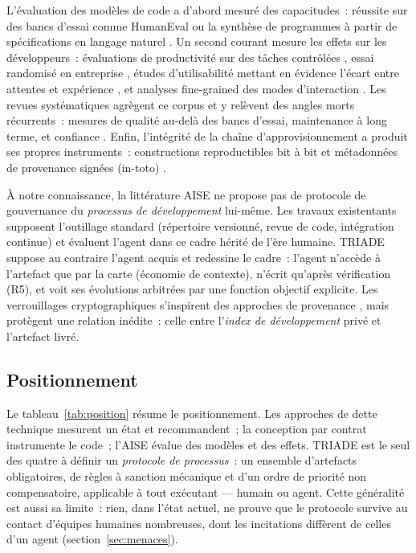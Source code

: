 L’évaluation des modèles de code a d’abord mesuré des capacitudes~: réussite
sur des bancs d’essai comme HumanEval \cite{chen2021} ou la synthèse de
programmes à partir de spécifications en langage naturel \cite{austin2021}.
Un second courant mesure les effets sur les développeurs~: évaluations de
productivité sur des tâches contrôlées \cite{ziegler2022}, essai randomisé en
entreprise \cite{peng2023}, études d’utilisabilité mettant en évidence
l’écart entre attentes et expérience \cite{vaithilingam2022}, et analyses
fine-grained des modes d’interaction \cite{barke2023}. Les revues
systématiques agrègent ce corpus et y relèvent des angles morts récurrents~:
mesures de qualité au-delà des bancs d’essai, maintenance à long terme,
et confiance \cite{hou2024,fan2023}. Enfin, l’intégrité de la chaîne
d’approvisionnement a produit ses propres instruments~: constructions
reproductibles bit à bit \cite{lamb2021} et métadonnées de provenance signées
(in-toto) \cite{torresarias2019}.

À notre connaissance, la littérature AISE ne propose pas de protocole de
gouvernance du \emph{processus de développement} lui-même. Les travaux
existentants supposent l’outillage standard (répertoire versionné, revue de
code, intégration continue) et évaluent l’agent dans ce cadre hérité de
l’ère humaine. TRIADE suppose au contraire l’agent acquis et redessine le
cadre~: l’agent n’accède à l’artefact que par la carte (économie de
contexte), n’écrit qu’après vérification (R5), et voit ses évolutions
arbitrées par une fonction objectif explicite. Les verrouillages
cryptographiques s’inspirent des approches de provenance
\cite{torresarias2019,lamb2021}, mais protègent une relation inédite~: celle
entre l’\emph{index de développement} privé et l’artefact livré.

\subsection{Positionnement}\label{sec:connexes-position}

Le tableau~\ref{tab:position} résume le positionnement. Les approches de
dette technique mesurent un état et recommandent~; la conception par contrat
instrumente le code~; l’AISE évalue des modèles et des effets. TRIADE est le
seul des quatre à définir un \emph{protocole de processus}~: un ensemble
d’artefacts obligatoires, de règles à sanction mécanique et d’un ordre de
priorité non compensatoire, applicable à tout exécutant — humain ou agent.
Cette généralité est aussi sa limite~: rien, dans l’état actuel, ne prouve
que le protocole survive au contact d’équipes humaines nombreuses, dont les
incitations diffèrent de celles d’un agent (section~\ref{sec:menaces}).

